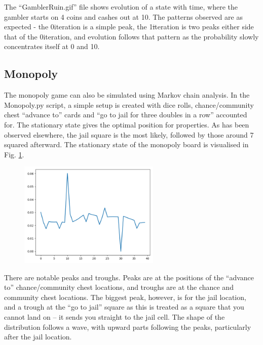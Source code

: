 \documentclass[12pt]{article}
\begin{document}
The ``GamblerRuin.gif'' file shows evolution of a state with time, where the gambler starts on 4 coins and cashes out at 10. 
The patterns observed are as expected - the 0\th iteration is a simple peak, the 1\st iteration is two peaks either side that of the 0\th iteration, and evolution follows that pattern as the probability slowly concentrates itself at 0 and 10.

\subsection{Monopoly}

The monopoly game can also be simulated using Markov chain analysis. In the Monopoly.py script, a simple setup is created with dice rolls, chance/community chest ``advance to'' cards and ``go to jail for three doubles in a row'' accounted for. The stationary state gives the optimal position for properties. 
As has been observed elsewhere, the jail square is the most likely, followed by those around 7 squared afterward.
The stationary state of the monopoly board is visualised in Fig. \ref{fig:monopoly}.

\begin{figure}\label{fig:monopoly}
	\centering
	\includegraphics[width=0.6\textwidth]{MonopolyStationary.png}
\end{figure}

There are notable peaks and troughs. Peaks are at the positions of the ``advance to'' chance/community chest locations, and troughs are at the chance and community chest locations. The biggest peak, however, is for the jail location, and a trough at the ``go to jail'' square as this is treated as a square that you cannot land on -- it sends you straight to the jail cell. The shape of the distribution follows a wave, with upward parts following the peaks, particularly after the jail location.
\end{document}
